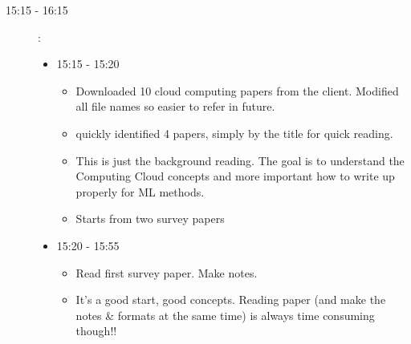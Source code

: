 \documentclass[a4paper]{article}
\begin{document}
\begin{description}
	\item[15:15 - 16:15]:
	\begin{itemize}
		\item 15:15 - 15:20
			\begin{itemize}
				\item Downloaded 10 cloud computing papers from the client. Modified all file names so easier to refer in future.
				\item quickly identified 4 papers, simply by the title for quick reading.
				\item This is just the background reading. The goal is to understand the Computing Cloud concepts and more important how to write up properly for ML methods.
				\item Starts from two survey papers
			\end{itemize}
		\item 15:20 - 15:55
		\begin{itemize}
			\item Read first survey paper. Make notes.
			\item It's a good start, good concepts. Reading paper (and make the notes \& formats at the same time) is always time consuming though!!
		\end{itemize} 
		 
	\end{itemize}
\end{description}





%
%
%
%
\end{document}
